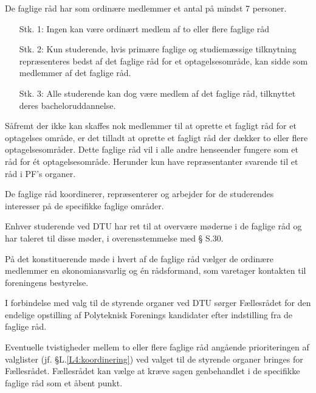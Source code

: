 \begin{list}
\item \label{L4:ordinaere} De faglige råd har som ordinære medlemmer et antal på mindst 7 personer.
\begin{itemize}%
	\item[Stk. 1:] \label{L4:ordinaere1} Ingen kan være ordinært medlem af to eller flere faglige råd
	
	\item[Stk. 2:] Kun studerende, hvis primære faglige og studiemæssige tilknytning repræsenteres bedst af det faglige råd for et optagelsesområde, kan sidde som medlemmer af det faglige råd.
	
	\item[Stk. 3:] Alle studerende kan dog være medlem af det faglige råd, tilknyttet deres bacheloruddannelse.

\end{itemize}

\item \label{L4:flereraad} Såfremt der ikke kan skaffes nok medlemmer til at oprette et fagligt råd for et optagelses område, er det tilladt at oprette et fagligt råd der dækker to eller flere optagelsesområder. Dette faglige råd vil i alle andre henseender fungere som et råd for ét optagelsesområde. Herunder kun have repræsentanter svarende til et råd i PF’s organer.

\item \label{L4:koordinering} De faglige råd koordinerer, repræsenterer og arbejder for de studerendes interesser på de specifikke faglige områder.

\item Enhver studerende ved DTU har ret til at overvære møderne i de faglige råd og har taleret til disse møder, i overensstemmelse med § S.30.

\item På det konstituerende møde i hvert af de faglige råd vælger de ordinære medlemmer en økonomiansvarlig og én rådsformand, som varetager kontakten til foreningens bestyrelse.

\item I forbindelse med valg til de styrende organer ved DTU sørger Fællesrådet for den endelige opstilling af Polyteknisk Forenings kandidater efter indstilling fra de faglige råd.

\item Eventuelle tvistigheder mellem to eller flere faglige råd angående prioriteringen af valglister (jf. §L.\ref{L4:koordinering}) ved valget til de styrende organer bringes for Fællesrådet. Fællesrådet kan vælge at kræve sagen genbehandlet i de specifikke faglige råd som et åbent punkt.



\end{list}
